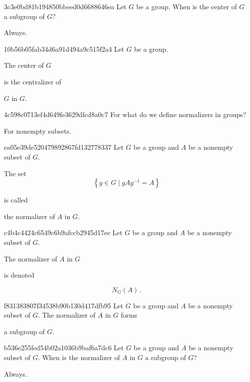 \begin{note}{3c3e0bd81b194850bbeed0d6688646ea}
    Let \({ G }\) be a group.
    When is the center of \({ G }\) a subgroup of \({ G }\)?

    \begin{cloze}{1}
        Always.
    \end{cloze}
\end{note}

\begin{note}{10b56b05fab34d6a91d494a9c515f2a4}
    Let \({ G }\) be a group.
    \begin{icloze}{2}The center of \({ G }\)\end{icloze} is the centralizer of \begin{icloze}{1}\({ G }\) in \({ G }\).\end{icloze}
\end{note}

\begin{note}{4c598c0713ef4d649fe3629dfcd8a0c7}
    For what do we define normalizers in groups?

    \begin{cloze}{1}
        For nonempty subsets.
    \end{cloze}
\end{note}

\begin{note}{ea05e39de520479892867fd132778337}
    Let \({ G }\) be a group and \({ A }\) be a nonempty subset of \({ G }\).
    \begin{icloze}{1}
        The set
        \[
            \left\{ g \in G \mid gAg^{-1} = A \right\}
        \]
    \end{icloze}
    is called \begin{icloze}{1}the normalizer of \({ A }\) in \({ G }\).\end{icloze}
\end{note}

\begin{note}{c4b4c4424c6549c6b9afccb2945d17ee}
    Let \({ G }\) be a group and \({ A }\) be a nonempty subset of \({ G }\).
    \begin{icloze}{2}The normalizer of \({ A }\) in \({ G }\)\end{icloze} is denoted
    \begin{icloze}{1}
        \[
            N_G(A)\,.
        \]
    \end{icloze}
\end{note}

\begin{note}{f831383807f34538b90b130d417dfb95}
    Let \({ G }\) be a group and \({ A }\) be a nonempty subset of \({ G }\).
    The normalizer of \({ A }\) in \({ G }\) forms \begin{icloze}{1}a subgroup of \({ G }\).\end{icloze}
\end{note}

\begin{note}{b536e255fed54b02a1036b9baf6a7dc6}
    Let \({ G }\) be a group and \({ A }\) be a nonempty subset of \({ G }\).
    When is the normalizer of \({ A }\) in \({ G }\) a subgroup of \({ G }\)?

    \begin{cloze}{1}
        Always.
    \end{cloze}
\end{note}


